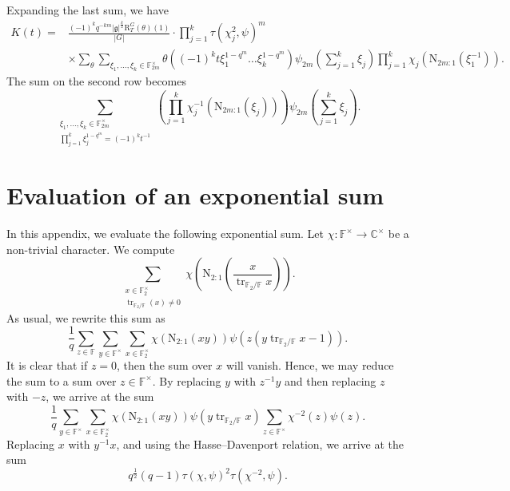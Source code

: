 \documentclass[12pt, reqno]{amsart}
\theoremstyle{definition}
\theoremstyle{definition}
\theoremstyle{definition}
\newcommand{\cComplex}{\mathbb{C}}
\newcommand{\multiplicativegroup}[1]{#1^{\times}}
\newcommand{\sizeof}[1]{\left|#1\right|}
\newcommand{\fieldCharacter}{\psi}
\newcommand{\trace}{\operatorname{tr}}
\newcommand{\FieldNorm}[2]{\mathrm{N}_{#1:#2}}
\newcommand{\finiteField}{\mathbb{F}}
\newcommand{\finiteFieldExtension}[1]{\finiteField_{#1}}
\newcommand{\lieAlgebra}{\mathfrak{g}}
\newcommand{\DeligneLusztigInduction}[2]{\mathrm{R}_{#1}^{#2}}
\begin{document}
Expanding the last sum, we have
\begin{align*}
	K\left(t\right) = & \frac{\left(-1\right)^k q^{-km}  \sizeof{\lieAlgebra}^{\frac{k}{2}} \DeligneLusztigInduction{T}{G}\left(\theta\right)\left(1\right)}{\sizeof{G}} \cdot \prod_{j=1}^k \tau\left(\chi_j^2, \fieldCharacter\right)^m \\
	 & \times \sum_{\theta} \sum_{\xi_1,\dots,\xi_k \in \multiplicativegroup{\finiteFieldExtension{2m}}} \theta\left( \left(-1\right)^k t \xi_1^{1-q^m} \dots \xi_k^{1-q^m} \right) \fieldCharacter_{2m}\left(\sum_{j=1}^k \xi_j\right) \prod_{j=1}^k \chi_j\left(\FieldNorm{2m}{1}\left(\xi_1^{-1} \right)\right).
\end{align*}
The sum on the second row becomes
$$\sum_{\substack{\xi_1,\dots,\xi_k \in \multiplicativegroup{\finiteFieldExtension{2m}}\\
\prod_{j=1}^k \xi_j^{1-q^m} = \left(-1\right)^k t^{-1}}} \left(\prod_{j=1}^k \chi_j^{-1}\left(\FieldNorm{2m}{1}\left(\xi_j \right)\right)\right) \fieldCharacter_{2m}\left(\sum_{j=1}^k \xi_j\right).$$

\appendix
\section{Evaluation of an exponential sum}

In this appendix, we evaluate the following exponential sum. Let $\chi \colon \multiplicativegroup{\finiteField} \to \multiplicativegroup{\cComplex}$ be a non-trivial character. We compute $$\sum_{\substack{x \in \multiplicativegroup{\finiteFieldExtension{2}}\\
	\trace_{\finiteFieldExtension{2} \slash \finiteField}\left(x\right) \ne 0}} \chi\left(\FieldNorm{2}{1}\left(\frac{x}{\trace_{\finiteFieldExtension{2} \slash \finiteField} x}\right) \right).$$
As usual, we rewrite this sum as
$$\frac{1}{q} \sum_{z \in \finiteField} \sum_{y \in \multiplicativegroup{\finiteField}} \sum_{x \in \multiplicativegroup{\finiteFieldExtension{2}}} \chi\left(\FieldNorm{2}{1}\left(xy\right)\right) \fieldCharacter\left(z\left(y \trace_{\finiteFieldExtension{2} \slash \finiteField} x - 1\right)\right).$$
It is clear that if $z = 0$, then the sum over $x$ will vanish. Hence, we may reduce the sum to a sum over $z \in \multiplicativegroup{\finiteField}$. By replacing $y$ with $z^{-1} y$ and then replacing $z$ with $-z$, we arrive at the sum
$$\frac{1}{q} \sum_{y \in \multiplicativegroup{\finiteField}} \sum_{x \in \multiplicativegroup{\finiteFieldExtension{2}}} \chi\left(\FieldNorm{2}{1}\left(xy\right)\right) \fieldCharacter\left(y \trace_{\finiteFieldExtension{2} \slash \finiteField} x\right) \sum_{z \in \multiplicativegroup{\finiteField}} \chi^{-2}\left(z\right)\fieldCharacter\left(z\right).$$
Replacing $x$ with $y^{-1}x$, and using the Hasse--Davenport relation, we arrive at the sum
$$q^{\frac{1}{2}} \left(q-1\right) \tau\left(\chi, \fieldCharacter\right)^2 \tau\left(\chi^{-2}, \fieldCharacter\right).$$


\end{document}
